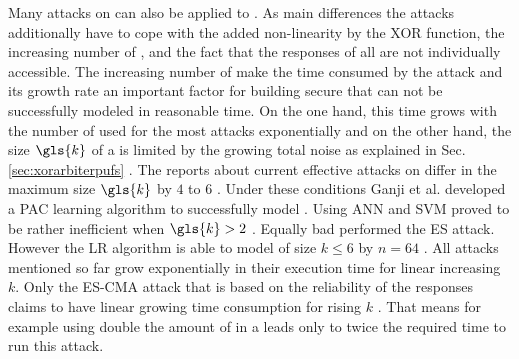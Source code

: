Many attacks on \apufs can also be applied to \xpufs.
As main differences the attacks additionally have to cope with the added non-linearity by the \ac{XOR} function, the increasing number of \apufs, and the fact that the responses of all \apufs are not individually accessible.
The increasing number of \apufs make the time consumed by the attack and its growth rate an important factor for building secure \xpufs that can not be successfully modeled in reasonable time.
On the one hand, this time grows with the number of used \apufs for the most attacks exponentially and on the other hand, the size $\gls{k}$ of a \xpuf is limited by the growing total noise as explained in Sec. \ref{sec:xorarbiterpufs} \cite{Ruhrmair2010ModelingFunctions}.
The reports about current effective attacks on \xpufs differ in the maximum size $\gls{k}$ by $4$ to $6$ \cite{Ganji2015WhyPUFs, Xu2014Hybrid}.
Under these conditions Ganji et al. developed a \ac{PAC} learning algorithm to successfully model \xpufs \cite{Ganji2015WhyPUFs}.
Using \ac{ANN} and \ac{SVM} proved to be rather inefficient when $\gls{k} > 2$ \cite{Hospodar2012MachineUsability}.
Equally bad performed the \ac{ES} attack.
However the \ac{LR} algorithm is able to model \xpufs of size $k \le 6$ by $n = 64$ \cite{Ruhrmair2010ModelingFunctions}.
All attacks mentioned so far grow exponentially in their execution time for linear increasing $k$.
Only the \ac{ES-CMA} attack that is based on the reliability of the responses claims to have linear growing time consumption for rising $k$ \cite{Becker2015ThePUFs}.
That means for example using double the amount of \apufs in a \xpufs leads only to twice the required time to run this attack.


